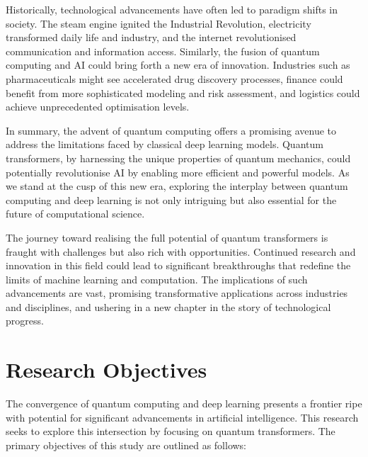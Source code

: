 Historically, technological advancements have often led to paradigm
shifts in society. The steam engine ignited the Industrial
Revolution, electricity transformed daily life and industry, and the
internet revolutionised communication and information access.
Similarly, the fusion of quantum computing and AI could bring forth a new
era of innovation. Industries such as pharmaceuticals might see
accelerated drug discovery processes, finance could benefit from more
sophisticated modeling and risk assessment, and logistics could
achieve unprecedented optimisation levels.

In summary, the advent of quantum computing offers a promising avenue
to address the limitations faced by classical deep learning models.
Quantum transformers, by harnessing the unique properties of quantum
mechanics, could potentially revolutionise AI by enabling more
efficient and powerful models. As we stand at the cusp of this new
era, exploring the interplay between quantum computing and deep
learning is not only intriguing but also essential for the future of
computational science.

The journey toward realising the full potential of quantum
transformers is fraught with challenges but also rich with
opportunities. Continued research and innovation in this field could
lead to significant breakthroughs that redefine the limits of machine
learning and computation. The implications of such advancements are
vast, promising transformative applications across industries and
disciplines, and ushering in a new chapter in the story of
technological progress.

\section{Research Objectives}
\label{sec:research_objectives}

The convergence of quantum computing and deep learning presents a
frontier ripe with potential for significant advancements in
artificial intelligence. This research seeks to explore this
intersection by focusing on quantum transformers.
The primary objectives of this study are outlined as follows:

